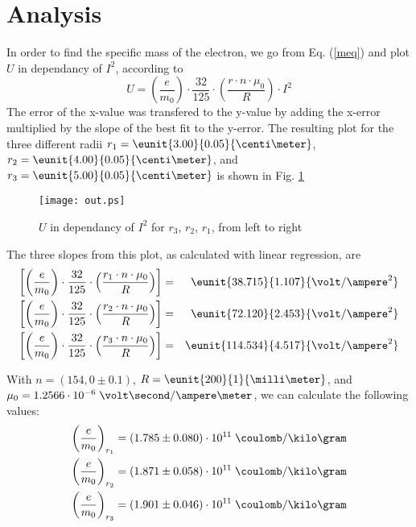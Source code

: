 \documentclass[a4paper,10pt]{article}
\begin{document}
\clearpage


\section{Analysis}
In order to find the specific mass of the electron, we go from Eq. (\ref{meq}) and plot $U$ in dependancy of $I^2$, according to
\begin{equation}
U = \left(\frac{e}{m_0} \right) \cdot \frac{32}{125} \cdot \left( \frac{r \cdot n \cdot \mu_0}{R} \right) \cdot I^2
\end{equation}
The error of the x-value was transfered to the y-value by adding the x-error multiplied by the slope of the best fit to the y-error.
The resulting plot for the three different radii $r_1 = \eunit{3.00}{0.05}{\centi\meter}$, $r_2 = \eunit{4.00}{0.05}{\centi\meter}$, and $r_3 = \eunit{5.00}{0.05}{\centi\meter}$ is shown in Fig. \ref{results}
\begin{figure}[h]
    \centering
    \texttt{[image: out.ps]}
\caption{$U$ in dependancy of $I^2$ for $r_3$, $r_2$, $r_1$, from left to right}
\label{results}
\end{figure}

The three slopes from this plot, as calculated with linear regression, are
\begin{eqnarray*}
\left[\left(\frac{e}{m_0} \right) \cdot \frac{32}{125} \cdot \left( \frac{r_1 \cdot n \cdot \mu_0}{R} \right) \right] &=& \eunit{38.715}{1.107}{\volt / \ampere^2}\\
\left[\left(\frac{e}{m_0} \right) \cdot \frac{32}{125} \cdot \left( \frac{r_2 \cdot n \cdot \mu_0}{R} \right) \right] &=& \eunit{72.120}{2.453}{\volt / \ampere^2}\\
\left[\left(\frac{e}{m_0} \right) \cdot \frac{32}{125} \cdot \left( \frac{r_3 \cdot n \cdot \mu_0}{R} \right) \right] &=& \eunit{114.534}{4.517}{\volt / \ampere^2}
\end{eqnarray*}

With $n=(154,0 \pm 0.1)$, $R= \eunit{200}{1}{\milli\meter}$, and $\mu_0 = 1.2566 \cdot 10^{-6} \; \volt\second/\ampere\meter$, we can calculate the following values:
\begin{eqnarray*}
\left(\frac{e}{m_0} \right)_{r_1} = (1.785 \pm 0.080) \cdot 10^{11} \; \coulomb/\kilo\gram\\
\left(\frac{e}{m_0} \right)_{r_2} = (1.871 \pm 0.058) \cdot 10^{11} \; \coulomb/\kilo\gram\\
\left(\frac{e}{m_0} \right)_{r_3} = (1.901 \pm 0.046) \cdot 10^{11} \; \coulomb/\kilo\gram
\end{eqnarray*}
\end{document}
